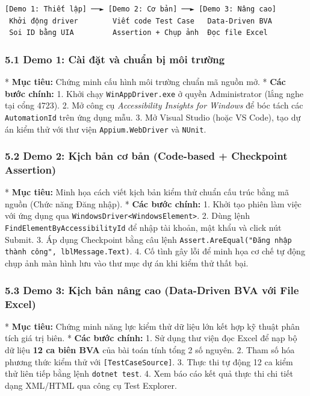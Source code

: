 \begin{lstlisting}
[Demo 1: Thiết lập] ──► [Demo 2: Cơ bản] ──► [Demo 3: Nâng cao]
 Khởi động driver        Viết code Test Case   Data-Driven BVA
 Soi ID bằng UIA         Assertion + Chụp ảnh  Đọc file Excel
\end{lstlisting}


\subsubsection{5.1 Demo 1: Cài đặt và chuẩn bị môi trường}
* \textbf{Mục tiêu:} Chứng minh cấu hình môi trường chuẩn mã nguồn mở.
* \textbf{Các bước chính:}
  1. Khởi chạy \texttt{WinAppDriver.exe} ở quyền Administrator (lắng nghe tại cổng 4723).
  2. Mở công cụ \textit{Accessibility Insights for Windows} để bóc tách các \texttt{AutomationId} trên ứng dụng mẫu.
  3. Mở Visual Studio (hoặc VS Code), tạo dự án kiểm thử với thư viện \texttt{Appium.WebDriver} và \texttt{NUnit}.

\subsubsection{5.2 Demo 2: Kịch bản cơ bản (Code-based + Checkpoint Assertion)}
* \textbf{Mục tiêu:} Minh họa cách viết kịch bản kiểm thử chuẩn cấu trúc bằng mã nguồn (Chức năng Đăng nhập).
* \textbf{Các bước chính:}
  1. Khởi tạo phiên làm việc với ứng dụng qua \texttt{WindowsDriver<WindowsElement>}.
  2. Dùng lệnh \texttt{FindElementByAccessibilityId} để nhập tài khoản, mật khẩu và click nút Submit.
  3. Áp dụng Checkpoint bằng câu lệnh \texttt{Assert.AreEqual("Đăng nhập thành công", lblMessage.Text)}.
  4. Cố tình gây lỗi để minh họa cơ chế tự động chụp ảnh màn hình lưu vào thư mục dự án khi kiểm thử thất bại.

\subsubsection{5.3 Demo 3: Kịch bản nâng cao (Data-Driven BVA với File Excel)}
* \textbf{Mục tiêu:} Chứng minh năng lực kiểm thử dữ liệu lớn kết hợp kỹ thuật phân tích giá trị biên.
* \textbf{Các bước chính:}
  1. Sử dụng thư viện đọc Excel để nạp bộ dữ liệu \textbf{12 ca biên BVA} của bài toán tính tổng 2 số nguyên.
  2. Tham số hóa phương thức kiểm thử với \texttt{[TestCaseSource]}.
  3. Thực thi tự động 12 ca kiểm thử liên tiếp bằng lệnh \texttt{dotnet test}.
  4. Xem báo cáo kết quả thực thi chi tiết dạng XML/HTML qua công cụ Test Explorer.


